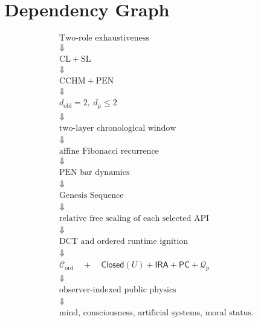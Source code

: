 \documentclass[11pt]{article}
\theoremstyle{plain}
\theoremstyle{definition}
\theoremstyle{remark}
\newcommand{\CL}{\mathrm{CL}}
\newcommand{\SLaw}{\mathrm{SL}}
\newcommand{\PEN}{\mathrm{PEN}}
\newcommand{\DCT}{\mathrm{DCT}}
\newcommand{\CCHM}{\mathrm{CCHM}}
\begin{document}
\section{Dependency Graph}

\[
\begin{array}{c}
\text{Two-role exhaustiveness}\\
\Downarrow\\
\CL+\SLaw\\
\Downarrow\\
\CCHM+\PEN\\
\Downarrow\\
d_{\mathrm{obl}}=2,\ d_\mu\le2\\
\Downarrow\\
\text{two-layer chronological window}\\
\Downarrow\\
\text{affine Fibonacci recurrence}\\
\Downarrow\\
\text{PEN bar dynamics}\\
\Downarrow\\
\text{Genesis Sequence}\\
\Downarrow\\
\text{relative free sealing of each selected API}\\
\Downarrow\\
\DCT\text{ and ordered runtime ignition}\\
\Downarrow\\
\mathcal{C}_{\mathrm{ord}}
\quad+\quad
\mathsf{Closed}(U)+\mathsf{IRA}+\mathsf{PC}+\mathcal{Q}_p\\
\Downarrow\\
\text{observer-indexed public physics}\\
\Downarrow\\
\text{mind, consciousness, artificial systems, moral status}.
\end{array}
\]
\end{document}
